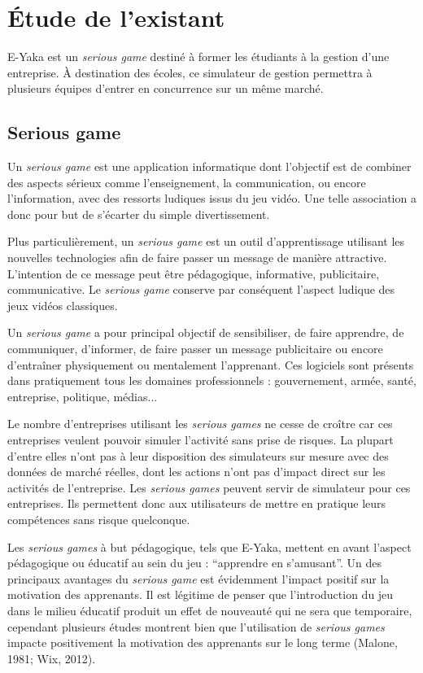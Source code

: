 \chapter{Étude de l’existant}

    E-Yaka est un \emph{serious game} destiné à former les étudiants à la gestion d'une entreprise. À destination des écoles, ce simulateur de gestion permettra à plusieurs équipes d'entrer en concurrence sur un même marché.

    \section{Serious game}

        Un \emph{serious game} est une application informatique dont l'objectif est de combiner des aspects sérieux comme l'enseignement, la communication, ou encore l'information, avec des ressorts ludiques issus du jeu vidéo. Une telle association a donc pour but de s'écarter du simple divertissement.

        Plus particulièrement, un \emph{serious game} est un outil d’apprentissage utilisant les nouvelles technologies afin de faire passer un message de manière attractive. L’intention de ce message peut être pédagogique, informative, publicitaire, communicative. Le \emph{serious game} conserve par conséquent l’aspect ludique des jeux vidéos classiques.

        Un \emph{serious game} a pour principal objectif de sensibiliser, de faire apprendre, de communiquer, d’informer, de faire passer un message publicitaire ou encore d’entraîner physiquement ou mentalement l’apprenant. Ces logiciels sont présents dans pratiquement tous les domaines professionnels : gouvernement, armée, santé, entreprise, politique, médias...

        Le nombre d’entreprises utilisant les \emph{serious games} ne cesse de croître car ces entreprises veulent pouvoir simuler l’activité sans prise de risques. La plupart d'entre elles n’ont pas à leur disposition des simulateurs sur mesure avec des données de marché réelles, dont les actions n'ont pas d'impact direct sur les activités de l’entreprise. Les \emph{serious games} peuvent servir de simulateur pour ces entreprises. Ils permettent donc aux utilisateurs de mettre en pratique leurs compétences sans risque quelconque.

        Les \emph{serious games} à but pédagogique, tels que E-Yaka, mettent en avant l’aspect pédagogique ou éducatif au sein du jeu : \enquote{apprendre en s’amusant}. Un des principaux avantages du \emph{serious game} est évidemment l’impact positif sur la motivation des apprenants. Il est légitime de penser que l’introduction du jeu dans le milieu éducatif produit un effet de nouveauté qui ne sera que temporaire, cependant plusieurs études montrent bien que l’utilisation de \emph{serious games} impacte positivement la motivation des apprenants sur le long terme (Malone, 1981; Wix, 2012).

